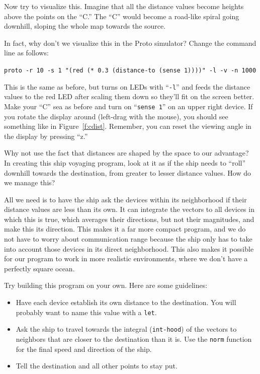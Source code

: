 \documentclass{article}
\newcommand\code[1]{\begin{center}\var{#1}\end{center}}
\newcommand\var[1]{{\tt #1}}
\newcommand\qvar[1]{``{\tt #1}''}
\begin{document}
Now try to visualize this.  Imagine that all the distance values
become heights above the points on the ``C.''  The ``C'' would become
a road-like spiral going downhill, sloping the whole map towards the
source.

In fact, why don't we visualize this in the Proto simulator?  Change
the command line as follows:

\code{proto -r 10 -s 1 "(red (* 0.3 (distance-to (sense 1))))" -l -v -n 1000}

This is the same as before, but turns on LEDs with \qvar{-l} and feeds
the distance values to the red LED after scaling them down so they'll
fit on the screen better.  Make your ``C'' sea as before and turn on
\qvar{sense 1} on an upper right device.  If you rotate the display
around (left-drag with the mouse), you should see something like in
Figure~\ref{f:cdist}.  Remember, you can reset the viewing angle in
the display by pressing ``z.''

Why not use the fact that distances are shaped by the space to our
advantage?  In creating this ship voyaging program, look at it as if
the ship needs to ``roll'' downhill towards the destination, from
greater to lesser distance values.  How do we manage this?

All we need is to have the ship ask the devices within its
neighborhood if their distance values are less than its own.  It can
integrate the vectors to all devices in which this is true, which
averages their directions, but not their magnitudes, and make this its
direction.  This makes it a far more compact program, and we do not
have to worry about communication range because the ship only has to
take into account those devices in its direct neighborhood.  This also
makes it possible for our program to work in more realistic
environments, where we don't have a perfectly square ocean.

Try building this program on your own. Here are some guidelines:
\begin{itemize}
\item Have each device establish its own distance to the destination.
  You will probably want to name this value with a \var{let}.
\item Ask the ship to travel towards the integral (\var{int-hood}) of
  the vectors to neighbors that are closer to the destination than it
  is.  Use the \var{norm} function for the final speed and direction
  of the ship.
\item Tell the destination and all other points to stay put.
\end{itemize}
\end{document}
